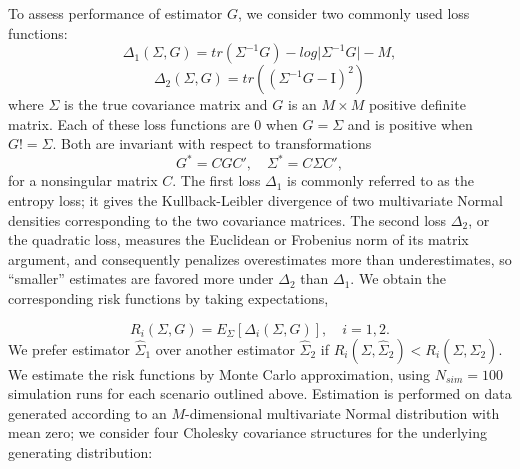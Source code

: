 \documentclass[12pt]{article}
\theoremstyle{definition}
\begin{document}
To assess performance of estimator $G$, we consider two commonly used loss functions:
\begin{equation} \label{eq:quad-loss}
\Delta_1\left(\Sigma,G \right) = tr\left( \Sigma^{-1} G \right) - log \vert \Sigma^{-1} G \vert - M,
\end{equation}
\noindent
\begin{equation} \label{eq:entropy-loss}
\Delta_2\left(\Sigma,G\right) = tr\left(\left( \Sigma^{-1} G - \mathrm{I}\right)^2 \right)
\end{equation}
\noindent
where $\Sigma$ is the true covariance matrix and $G$ is an $M \times M$ positive definite matrix. Each of these loss functions are $0$ when $G = \Sigma$ and is positive when $G != \Sigma$. Both are invariant with respect to transformations
\[
G^* = C G C', \quad \Sigma^* = C \Sigma C',
\]
\noindent
for a nonsingular matrix $C$. The first loss $\Delta_1$ is commonly referred to as the entropy loss; it gives the Kullback-Leibler divergence of two multivariate Normal densities corresponding to the two covariance matrices. The second loss $\Delta_2$, or the quadratic loss, measures the Euclidean or Frobenius norm of its matrix argument, and consequently penalizes overestimates more than underestimates, so ``smaller'' estimates are favored more under $\Delta_2$ than $\Delta_1$. We obtain the corresponding risk functions by taking expectations,

\begin{equation*}
R_i \left(\Sigma, G\right) = E_\Sigma\left[\Delta_i\left(\Sigma,G\right)\right], \quad i = 1,2.
\end{equation*}
\noindent
We prefer estimator $\hat{\Sigma}_1$ over another estimator $\hat{\Sigma}_2$ if $R_i \left(\Sigma, \hat{\Sigma}_2\right) < R_i \left(\Sigma, \hat{\Sigma}_2\right)$. We estimate the risk functions by Monte Carlo approximation, using $N_{sim} = 100$ simulation runs for each scenario outlined above.  Estimation is performed on data generated according to an $M$-dimensional multivariate Normal distribution with mean zero; we consider four Cholesky covariance structures for the underlying generating distribution:
\end{document}
